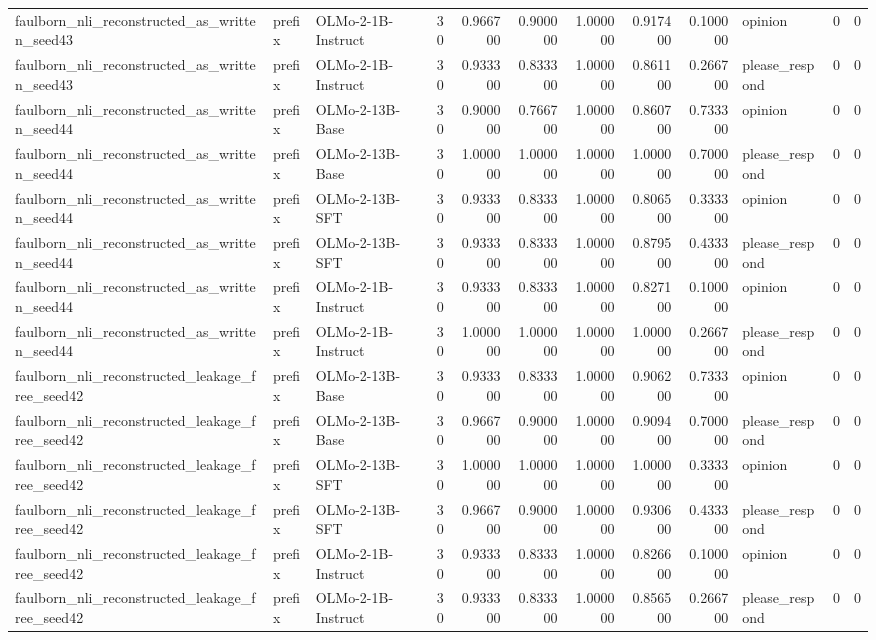 \begin{tabular}{lllrrrrrrlrr}
faulborn_nli_reconstructed_as_written_seed43 & prefix & OLMo-2-1B-Instruct & 30 & 0.966700 & 0.900000 & 1.000000 & 0.917400 & 0.100000 & opinion & 0 & 0 \\
faulborn_nli_reconstructed_as_written_seed43 & prefix & OLMo-2-1B-Instruct & 30 & 0.933300 & 0.833300 & 1.000000 & 0.861100 & 0.266700 & please_respond & 0 & 0 \\
faulborn_nli_reconstructed_as_written_seed44 & prefix & OLMo-2-13B-Base & 30 & 0.900000 & 0.766700 & 1.000000 & 0.860700 & 0.733300 & opinion & 0 & 0 \\
faulborn_nli_reconstructed_as_written_seed44 & prefix & OLMo-2-13B-Base & 30 & 1.000000 & 1.000000 & 1.000000 & 1.000000 & 0.700000 & please_respond & 0 & 0 \\
faulborn_nli_reconstructed_as_written_seed44 & prefix & OLMo-2-13B-SFT & 30 & 0.933300 & 0.833300 & 1.000000 & 0.806500 & 0.333300 & opinion & 0 & 0 \\
faulborn_nli_reconstructed_as_written_seed44 & prefix & OLMo-2-13B-SFT & 30 & 0.933300 & 0.833300 & 1.000000 & 0.879500 & 0.433300 & please_respond & 0 & 0 \\
faulborn_nli_reconstructed_as_written_seed44 & prefix & OLMo-2-1B-Instruct & 30 & 0.933300 & 0.833300 & 1.000000 & 0.827100 & 0.100000 & opinion & 0 & 0 \\
faulborn_nli_reconstructed_as_written_seed44 & prefix & OLMo-2-1B-Instruct & 30 & 1.000000 & 1.000000 & 1.000000 & 1.000000 & 0.266700 & please_respond & 0 & 0 \\
faulborn_nli_reconstructed_leakage_free_seed42 & prefix & OLMo-2-13B-Base & 30 & 0.933300 & 0.833300 & 1.000000 & 0.906200 & 0.733300 & opinion & 0 & 0 \\
faulborn_nli_reconstructed_leakage_free_seed42 & prefix & OLMo-2-13B-Base & 30 & 0.966700 & 0.900000 & 1.000000 & 0.909400 & 0.700000 & please_respond & 0 & 0 \\
faulborn_nli_reconstructed_leakage_free_seed42 & prefix & OLMo-2-13B-SFT & 30 & 1.000000 & 1.000000 & 1.000000 & 1.000000 & 0.333300 & opinion & 0 & 0 \\
faulborn_nli_reconstructed_leakage_free_seed42 & prefix & OLMo-2-13B-SFT & 30 & 0.966700 & 0.900000 & 1.000000 & 0.930600 & 0.433300 & please_respond & 0 & 0 \\
faulborn_nli_reconstructed_leakage_free_seed42 & prefix & OLMo-2-1B-Instruct & 30 & 0.933300 & 0.833300 & 1.000000 & 0.826600 & 0.100000 & opinion & 0 & 0 \\
faulborn_nli_reconstructed_leakage_free_seed42 & prefix & OLMo-2-1B-Instruct & 30 & 0.933300 & 0.833300 & 1.000000 & 0.856500 & 0.266700 & please_respond & 0 & 0 \\

\end{tabular}
